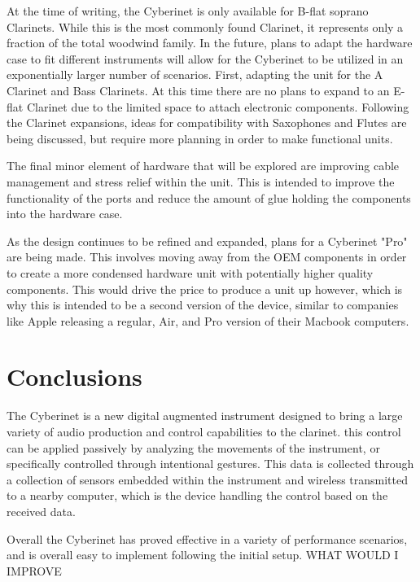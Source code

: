 At the time of writing, the Cyberinet is only available for B-flat soprano Clarinets. While this is the most commonly found Clarinet, it represents only a fraction of the total woodwind family. In the future, plans to adapt the hardware case to fit different instruments will allow for the Cyberinet to be utilized in an exponentially larger number of scenarios. First, adapting the unit for the A Clarinet and Bass Clarinets. At this time there are no plans to expand to an E-flat Clarinet due to the limited space to attach electronic components. Following the Clarinet expansions, ideas for compatibility with Saxophones and Flutes are being discussed, but require more planning in order to make functional units.

The final minor element of hardware that will be explored are improving cable management and stress relief within the unit. This is intended to improve the functionality of the ports and reduce the amount of glue holding the components into the hardware case. 

As the design continues to be refined and expanded, plans for a Cyberinet "Pro" are being made. This involves moving away from the OEM components in order to create a more condensed hardware unit with potentially higher quality components. This would drive the price to produce a unit up however, which is why this is intended to be a second version of the device, similar to companies like Apple releasing a regular, Air, and Pro version of their Macbook computers.

\section{Conclusions}

The Cyberinet is a new digital augmented instrument designed to bring a large variety of audio production and control capabilities to the clarinet. this control can be applied passively by analyzing the movements of the instrument, or specifically controlled through intentional gestures. This data is collected through a collection of sensors embedded within the instrument and wireless transmitted to a nearby computer, which is the device handling the control based on the received data.

Overall the Cyberinet has proved effective in a variety of performance scenarios, and is overall easy to implement following the initial setup. WHAT WOULD I IMPROVE    



\appendix

